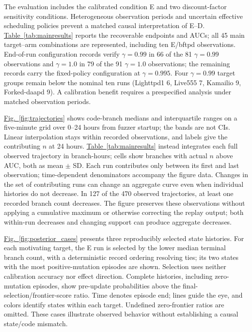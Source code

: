 \documentclass[final,5p,times,number]{elsarticle}
\newcommand{\namedref}[2]{\hyperref[#2]{#1~\ref*{#2}}}
\newcommand{\figref}[1]{\namedref{Fig.}{#1}}
\begin{document}
The evaluation includes the calibrated condition E and two discount-factor sensitivity conditions. Heterogeneous observation periods and uncertain effective scheduling policies prevent a matched causal interpretation of E--D. \namedref{Table}{tab:mainresults} reports the recoverable endpoints and AUCs; all 45 main target--arm combinations are represented, including ten E/bftpd observations. End-of-run configuration records verify $\gamma=0.99$ in 66 of the 81 $\gamma=0.99$ observations and $\gamma=1.0$ in 79 of the 91 $\gamma=1.0$ observations; the remaining records carry the fixed-policy configuration at $\gamma=0.995$. Four $\gamma=0.99$ target groups remain below the nominal ten runs (Lighttpd1 6, Live555 7, Kamailio 9, Forked-daapd 9). A calibration benefit requires a prespecified analysis under matched observation periods.

\figref{fig:trajectories} shows code-branch medians and interquartile ranges on a five-minute grid over 0--24 hours from fuzzer startup; the bands are not CIs. Linear interpolation stays within recorded observations, and labels give the contributing $n$ at 24 hours. \namedref{Table}{tab:mainresults} instead integrates each full observed trajectory in branch-hours; cells show branches with actual $n$ above AUC, both as mean $\pm$ SD. Each run contributes only between its first and last observation; time-dependent denominators accompany the figure data. Changes in the set of contributing runs can change an aggregate curve even when individual histories do not decrease. In 127 of the 470 observed trajectories, at least one recorded branch count decreases. The figure preserves these observations without applying a cumulative maximum or otherwise correcting the replay output; both within-run decreases and changing support can produce aggregate decreases.

\figref{fig:posterior_cases} presents three reproducibly selected state histories. For each motivating target, the E run is selected by the lower median terminal branch count, with a deterministic record ordering resolving ties; its two states with the most positive-mutation episodes are shown. Selection uses neither calibration accuracy nor effect direction. Complete histories, including zero-mutation episodes, show pre-update probabilities above the final-selection/frontier-score ratio. Time denotes episode end; lines guide the eye, and colors identify states within each target. Undefined zero-frontier ratios are omitted. These cases illustrate observed behavior without establishing a causal state/code mismatch.
\end{document}
